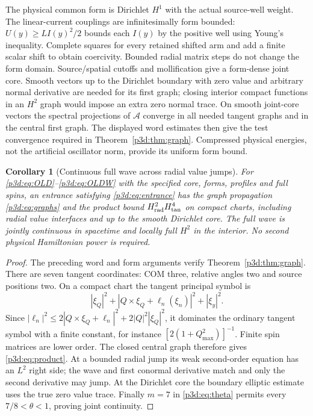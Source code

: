 \documentclass[11pt]{article}
\numberwithin{equation}{section}
\newtheorem{corollary}[theorem]{Corollary}
\theoremstyle{definition}
\theoremstyle{remark}
\begin{document}
The physical common form is Dirichlet $H^1$ with the actual source-well
weight. The linear-current couplings are infinitesimally form bounded:
$U(y)\geq LI(y)^2/2$ bounds each $I(y)$ by the positive well using
Young's inequality. Complete squares for every retained shifted arm
and add a finite scalar shift to obtain coercivity. Bounded radial
matrix steps do not change the form domain. Source/spatial cutoffs and
mollification give a form-dense joint core. Smooth vectors up to the
Dirichlet boundary with zero value and arbitrary normal derivative are
needed for its first graph; closing interior compact functions in an
$H^2$ graph would impose an extra zero normal trace.
On smooth joint-core vectors the spectral projections of $\mathcal A$
converge in all needed tangent graphs and in the central first graph.
The displayed word estimates then give the test convergence required
in Theorem~\ref{p3d:thm:graph}. Compressed physical energies, not the
artificial oscillator norm, provide its uniform form bound.

\begin{corollary}[Continuous full wave across radial value jumps]
\label{p3d:cor:OLD}
For \eqref{p3d:eq:OLD}--\eqref{p3d:eq:OLDW} with the specified core,
forms, profiles and full spins, an entrance satisfying
\eqref{p3d:eq:entrance} has the graph propagation
\eqref{p3d:eq:graphs} and the product bound
$H^2_{\rm rad}H^4_{\rm tan}$ on compact charts, including radial
value interfaces and up to the smooth Dirichlet core.
The full wave is jointly continuous in spacetime and locally full
$H^2$ in the interior. No second physical Hamiltonian power is required.
\end{corollary}
\begin{proof}
The preceding word and form arguments verify
Theorem~\ref{p3d:thm:graph}. There are seven tangent coordinates:
COM three, relative angles two and source positions two.
On a compact chart the tangent principal symbol is
\[
 |\xi_Q|^2+|Q\times\xi_Q+\ell_n(\xi_n)|^2+|\xi_y|^2.
\]
Since
$|\ell_n|^2\leq2|Q\times\xi_Q+\ell_n|^2+2|Q|^2|\xi_Q|^2$,
it dominates the ordinary tangent symbol with a finite constant,
for instance $[2(1+Q_{\max}^2)]^{-1}$.
Finite spin matrices are lower order. The closed central graph
therefore gives \eqref{p3d:eq:product}. At a bounded radial jump its
weak second-order equation has an $L^2$ right side; the wave and first
conormal derivative match and only the second derivative may jump.
At the Dirichlet core the boundary elliptic estimate uses the true zero
value trace. Finally $m=7$ in \eqref{p3d:eq:theta} permits every
$7/8<\theta<1$, proving joint continuity.
\end{proof}
\end{document}
